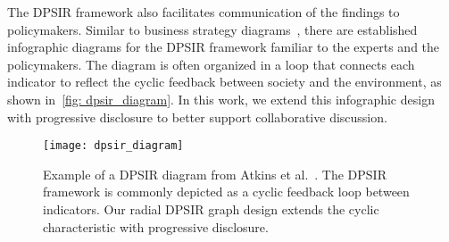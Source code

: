 The DPSIR framework also facilitates communication of the findings to policymakers. Similar to business strategy diagrams~\cite{brath2024managementdiagram}, there are established infographic diagrams for the DPSIR framework familiar to the experts and the policymakers. The diagram is often organized in a loop that connects each indicator to reflect the cyclic feedback between society and the environment, as shown in~\autoref{fig: dpsir_diagram}. In this work, we extend this infographic design with progressive disclosure to better support collaborative discussion. 
\begin{figure}[t]
  \centering
  \texttt{[image: dpsir\_diagram]}
  \caption{Example of a DPSIR diagram from Atkins et al.~\cite{atkins2011dpsir}. The DPSIR framework is commonly depicted as a cyclic feedback loop between indicators. Our radial DPSIR graph design extends the cyclic characteristic with progressive disclosure.}
  \label{fig: dpsir_diagram}
  \vspace*{-0.5cm}
\end{figure}



